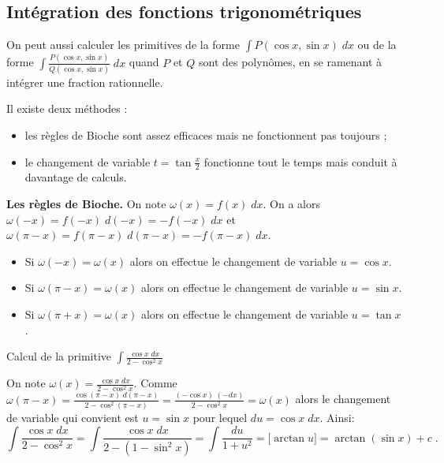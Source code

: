 \documentclass[class=report,crop=false]{standalone}
\begin{document}
\subsection{Intégration des fonctions trigonométriques}

On peut aussi calculer les primitives de la forme $\int P(\cos x,\sin x)\;dx$ ou de la forme
$\int \frac{P(\cos x,\sin x)}{Q(\cos x, \sin x)}\;dx$
quand $P$ et $Q$ sont des polynômes, en se ramenant à intégrer une fraction rationnelle.

Il existe deux méthodes :
\begin{itemize}
  \item les règles de Bioche sont assez efficaces mais ne fonctionnent pas toujours ;
  \item le changement de variable $t = \tan \frac x2$ fonctionne tout le temps mais conduit à davantage de calculs.
\end{itemize}

\bigskip

\textbf{Les règles de Bioche.}
On note $\omega(x) = f(x)\;dx$.
On a alors $\omega(-x)= f(-x)\;d(-x)=-f(-x)\;dx$ et
$\omega (\pi-x)= f(\pi-x)\;d(\pi-x)=-f(\pi-x)\;dx$.



\begin{itemize}
  \item Si $\omega(-x)=\omega(x)$ alors on effectue le changement de variable $u=\cos x$.

  \item Si $\omega(\pi-x)=\omega(x)$ alors on effectue le changement de variable $u=\sin x$.

  \item Si $\omega(\pi + x)=\omega(x)$ alors on effectue le changement de variable $u=\tan x$.
\end{itemize}

\begin{exemple}
Calcul de la primitive $\int \frac{\cos x \; dx}{2-\cos^2 x}$

On note $\omega(x)= \frac{\cos x \; dx}{2-\cos^2 x}$.
Comme $\omega(\pi-x)=\frac{\cos(\pi-x) \; d(\pi-x)}{2-\cos^2 (\pi-x)} = \frac{(-\cos x) \; (-dx)}{2-\cos^2 x}
= \omega(x)$ alors le changement de variable qui convient est $u = \sin x$
pour lequel $du= \cos x \; dx$. Ainsi:
\[
\int \frac{\cos x \; dx}{2-\cos^2 x}
= \int \frac{\cos x \; dx}{2-(1-\sin^2 x)}
= \int \frac{du}{1+u^2} = \big[ \arctan u \big]
= \arctan (\sin x) + c \; .
\]
\end{exemple}
\end{document}
